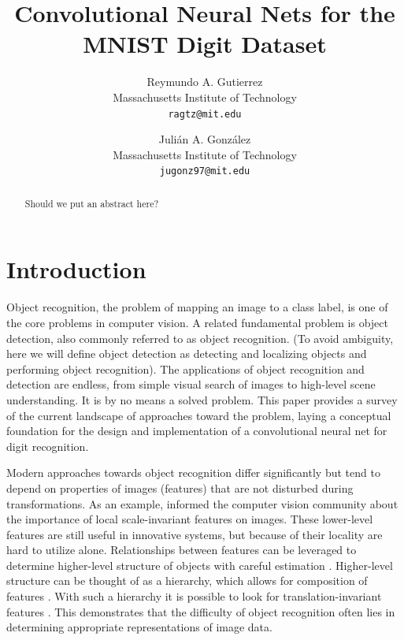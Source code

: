\documentclass[10pt,twocolumn,letterpaper]{article}
\begin{document}
\title{Convolutional Neural Nets for the MNIST Digit Dataset}

\author{Reymundo A. Gutierrez\\
Massachusetts Institute of Technology\\
{\tt\small ragtz@mit.edu}\\
\and
Juli\'{a}n A. Gonz\'{a}lez\\
Massachusetts Institute of Technology\\
{\tt\small jugonz97@mit.edu}
}

\maketitle

\begin{abstract}
   Should we put an abstract here?
\end{abstract}

\section{Introduction}

Object recognition, the problem of mapping an image to a class label, is one of the core
problems in computer vision.
A related fundamental problem is object detection, also commonly referred to as object recognition.
(To avoid ambiguity, here we will define object detection as detecting and localizing objects and
performing object recognition).
The applications of object recognition and detection are endless, from simple visual search of
images to high-level scene understanding. It is by no means a solved problem.
This paper provides a survey of the current landscape of approaches toward the problem,
laying a conceptual foundation for the design and implementation of a convolutional neural net for
digit recognition.

Modern approaches towards object recognition differ significantly but tend to depend on
properties of images (features) that are not disturbed during transformations.
As an example, \cite{LoweObjSIFT} informed the computer vision community about the importance of
local scale-invariant features on images.
These lower-level features are still useful in innovative systems, but because of their
locality are hard to utilize alone.
Relationships between features can be leveraged to determine higher-level structure of
objects with careful estimation \cite{PartModels}.
Higher-level structure can be thought of as a hierarchy, which allows for composition of features \cite{HintonDBN}.
With such a hierarchy it is possible to look for translation-invariant features \cite{CDBN}.
This demonstrates that the difficulty of object recognition often lies in determining
appropriate representations of image data.
\end{document}
